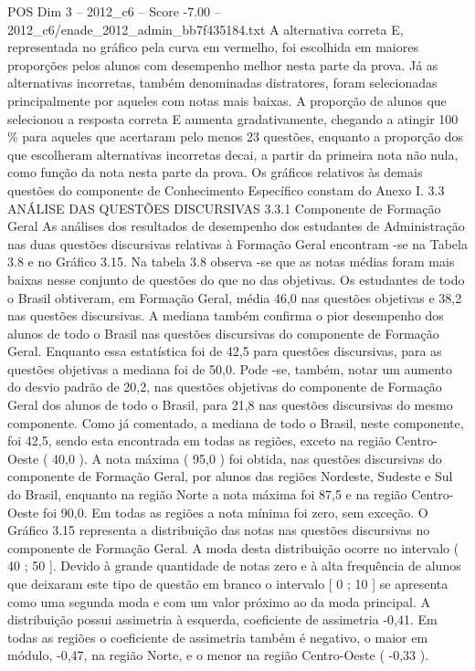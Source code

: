 \begin{textsample}{POS Dim 3 – 2012\_c6 – Score -7.00 – 2012\_c6/enade\_2012\_admin\_bb7f435184.txt}
A alternativa correta E, representada no gráfico pela curva em vermelho, foi escolhida em maiores proporções pelos alunos com desempenho melhor nesta parte da prova.
Já as alternativas incorretas, também denominadas distratores, foram selecionadas principalmente por aqueles com notas mais baixas.
A proporção de alunos que selecionou a resposta correta E aumenta gradativamente, chegando a atingir 100 \% para aqueles que acertaram pelo menos 23 questões, enquanto a proporção dos que escolheram alternativas incorretas decai, a partir da primeira nota não nula, como função da nota nesta parte da prova.
Os gráficos relativos às demais questões do componente de Conhecimento Específico constam do Anexo I. 3.3 ANÁLISE DAS QUESTÕES DISCURSIVAS 3.3.1 Componente de Formação Geral As análises dos resultados de desempenho dos estudantes de Administração nas duas questões discursivas relativas à Formação Geral encontram -se na Tabela 3.8 e no Gráfico 3.15.
Na tabela 3.8 observa -se que as notas médias foram mais baixas nesse conjunto de questões do que no das objetivas.
Os estudantes de todo o Brasil obtiveram, em Formação Geral, média 46,0 nas questões objetivas e 38,2 nas questões discursivas.
A mediana também confirma o pior desempenho dos alunos de todo o Brasil nas questões discursivas do componente de Formação Geral.
Enquanto essa estatística foi de 42,5 para questões discursivas, para as questões objetivas a mediana foi de 50,0.
Pode -se, também, notar um aumento do desvio padrão de 20,2, nas questões objetivas do componente de Formação Geral dos alunos de todo o Brasil, para 21,8 nas questões discursivas do mesmo componente.
Como já comentado, a mediana de todo o Brasil, neste componente, foi 42,5, sendo esta encontrada em todas as regiões, exceto na região Centro-Oeste ( 40,0 ).
A nota máxima ( 95,0 ) foi obtida, nas questões discursivas do componente de Formação Geral, por alunos das regiões Nordeste, Sudeste e Sul do Brasil, enquanto na região Norte a nota máxima foi 87,5 e na região Centro-Oeste foi 90,0.
Em todas as regiões a nota mínima foi zero, sem exceção.
O Gráfico 3.15 representa a distribuição das notas nas questões discursivas no componente de Formação Geral.
A moda desta distribuição ocorre no intervalo ( 40 ; 50 ].
Devido à grande quantidade de notas zero e à alta frequência de alunos que deixaram este tipo de questão em branco o intervalo [ 0 ; 10 ] se apresenta como uma segunda moda e com um valor próximo ao da moda principal.
A distribuição possui assimetria à esquerda, coeficiente de assimetria -0,41.
Em todas as regiões o coeficiente de assimetria também é negativo, o maior em módulo, -0,47, na região Norte, e o menor na região Centro-Oeste ( -0,33 ).

\end{textsample}
